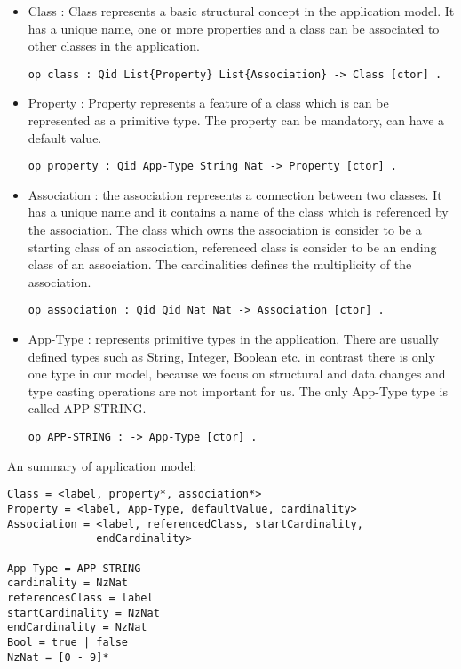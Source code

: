 \documentclass[11pt]{article}
\begin{document}
\begin{itemize}
	\item Class : Class represents a basic structural concept in the application model. It has a unique name, one or more properties and a class can be associated to other classes in the application.  
	\begin{verbatim}
op class : Qid List{Property} List{Association} -> Class [ctor] .
\end{verbatim}
	\item Property : Property represents a feature of  a class which is can be represented as a primitive type. The property can be mandatory, can have a default value.
	\begin{verbatim}
op property : Qid App-Type String Nat -> Property [ctor] .
\end{verbatim}
	\item Association : the association represents a connection between two classes. It has a unique name and it contains a name of the class which is referenced by the association. The class which owns the association is consider to be a starting class of an association, referenced class is consider to be an ending class of an association. The cardinalities defines the multiplicity of the association.
	\begin{verbatim}
op association : Qid Qid Nat Nat -> Association [ctor] .
\end{verbatim}
	\item App-Type : represents primitive types in the application. There are usually defined types such as String, Integer, Boolean etc. in contrast there is only one type in our model, because we focus on structural and data changes and type casting operations are not important for us. The only App-Type type is called APP-STRING.
	\begin{verbatim}
op APP-STRING : -> App-Type [ctor] .
	\end{verbatim}
\end{itemize}
An summary of application model:
\begin{verbatim}
Class = <label, property*, association*>
Property = <label, App-Type, defaultValue, cardinality>
Association = <label, referencedClass, startCardinality, 
              endCardinality>
              
App-Type = APP-STRING 
cardinality = NzNat
referencesClass = label
startCardinality = NzNat
endCardinality = NzNat
Bool = true | false
NzNat = [0 - 9]*
\end{verbatim}
\end{document}
